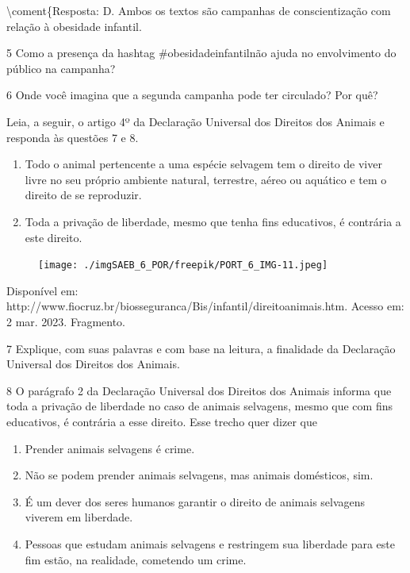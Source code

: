 \textbackslash coment\{Resposta: D. Ambos os textos são campanhas de
conscientização com relação à obesidade infantil.

\num{5} Como a presença da hashtag \#obesidadeinfantilnão ajuda no
envolvimento do público na campanha?


\num{6} Onde você imagina que a segunda campanha pode ter circulado? Por
quê?


Leia, a seguir, o artigo 4º da Declaração Universal dos Direitos dos
Animais e responda às questões 7 e 8.

\begin{enumerate}
\item Todo o animal pertencente a uma espécie selvagem tem o direito de
viver livre no seu próprio ambiente natural, terrestre, aéreo ou
aquático e tem o direito de se reproduzir.
\item Toda a privação de liberdade, mesmo que tenha fins educativos, é
contrária a este direito.
\end{enumerate}

\begin{figure}
\texttt{[image: ./imgSAEB\_6\_POR/freepik/PORT\_6\_IMG-11.jpeg]}
\end{figure}

Disponível em: 
http://www.fiocruz.br/biosseguranca/Bis/infantil/direitoanimais.htm.
Acesso em: 2 mar. 2023. Fragmento.

\num{7} Explique, com suas palavras e com base na leitura, a finalidade
da Declaração Universal dos Direitos dos Animais.


\num{8} O parágrafo 2 da Declaração Universal dos Direitos dos Animais
informa que toda a privação de liberdade no caso de animais selvagens,
mesmo que com fins educativos, é contrária a esse direito. Esse trecho
quer dizer que

\begin{enumerate}
\def\labelenumi{\alph{enumi})}
\item Prender animais selvagens é crime.
\item Não se podem prender animais selvagens, mas animais domésticos, sim.
\item É um dever dos seres humanos garantir o direito de animais selvagens
viverem em liberdade.
\item Pessoas que estudam animais selvagens e restringem sua liberdade para
este fim estão, na realidade, cometendo um crime.
\end{enumerate}


